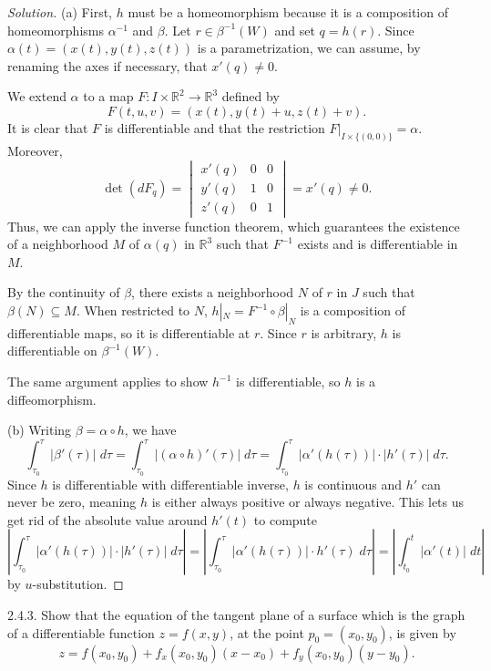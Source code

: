 \documentclass[10pt]{scrartcl}
\providecommand{\RR}{\mathbb R}
\providecommand{\inv}{^{-1}}
\providecommand{\dif}{\;d}
\newenvironment{soln}{\begin{proof}[Solution]}{\end{proof}}
\providecommand{\abs}[1]{\left|#1\right|}
\begin{document}
\begin{soln}
	(a) First, $h$ must be a homeomorphism because it is a composition
	of homeomorphisms $\alpha\inv$ and $\beta$.
	Let $r\in\beta\inv(W)$ and set $q = h(r)$.
	Since $\alpha(t) = (x(t), y(t), z(t))$ is a parametrization,
	we can assume, by renaming the axes if necessary, that $x'(q)\ne 0$.
	
	We extend $\alpha$ to a map $F\colon I\times\RR^2\to\RR^3$ defined by
	\[F(t, u, v) = (x(t), y(t) + u, z(t) + v).\]
	It is clear that $F$ is differentiable and that the restriction
	$F|_{I\times\{(0,0)\}} = \alpha$. Moreover,
	\[\det(dF_q) = \begin{vmatrix}
		x'(q) & 0 & 0\\
		y'(q) & 1 & 0\\
		z'(q) & 0 & 1
	\end{vmatrix} = x'(q)\ne 0.\]
	Thus, we can apply the inverse function theorem, which guarantees
	the existence of a neighborhood $M$ of $\alpha(q)$ in $\RR^3$
	such that $F\inv$ exists and is differentiable in $M$.
	
	By the continuity of $\beta$, there exists a neighborhood $N$ of $r$ in $J$
	such that $\beta(N)\subseteq M$. When restricted to $N$,
	$h|_N = F\inv\circ \beta|_N$ is a composition of differentiable maps,
	so it is differentiable at $r$. Since $r$ is arbitrary,
	$h$ is differentiable on $\beta\inv(W)$.
	
	The same argument applies to show $h\inv$ is differentiable,
	so $h$ is a diffeomorphism.
	
	(b) Writing $\beta = \alpha\circ h$, we have
	\[\int_{\tau_0}^\tau |\beta'(\tau)|\dif\tau =
	\int_{\tau_0}^\tau |(\alpha\circ h)'(\tau)|\dif\tau =
	\int_{\tau_0}^\tau |\alpha' (h(\tau))|\cdot |h'(\tau)|\dif\tau.\]
	Since $h$ is differentiable with differentiable inverse,
	$h$ is continuous and $h'$ can never be zero,
	meaning $h$ is either always positive or always negative.
	This lets us get rid of the absolute value around $h'(t)$ to compute
	\[\abs{\int_{\tau_0}^\tau |\alpha' (h(\tau))|\cdot |h'(\tau)|\dif\tau}
	= \abs{\int_{\tau_0}^\tau |\alpha' (h(\tau))|\cdot h'(\tau)\dif\tau}
	= \abs{\int_{t_0}^t |\alpha' (t)| \dif t}\]
	by $u$-substitution.
\end{soln}

\begin{problem*}2.4.3.
	Show that the equation of the tangent plane of a surface
	which is the graph of a differentiable function $z = f(x,y)$,
	at the point $p_0 = (x_0,y_0)$, is given by
	\[z = f(x_0,y_0) + f_x(x_0,y_0)(x - x_0) + f_y(x_0,y_0)(y - y_0).\]
\end{problem*}
\end{document}

